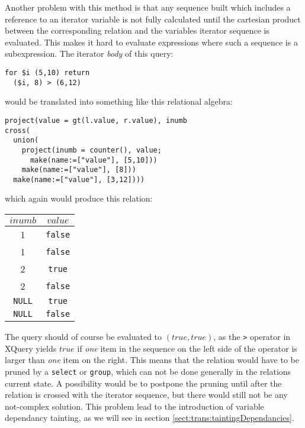 Another problem with this method is that any sequence built which includes a reference to an iterator variable is
not fully calculated until the cartesian product between the corresponding relation and the variables iterator
sequence is evaluated. This makes it hard to evaluate expressions where such a sequence is a subexpression. The
iterator \textit{body} of this query:

\begin{Verbatim}
for $i (5,10) return
  ($i, 8) > (6,12)
\end{Verbatim}
would be translated into something like this relational algebra:
\begin{Verbatim}
project(value = gt(l.value, r.value), inumb
cross(
  union(
    project(inumb = counter(), value;
      make(name:=["value"], [5,10]))
    make(name:=["value"], [8]))
  make(name:=["value"], [3,12])))
\end{Verbatim}
which again would produce this relation:

\begin{figure*}[!h]
\centering
\begin{tabular}{|c|c|} \hline
$inumb$ & $value$ \\\hline
1 & \texttt{false} \\\hline
1 & \texttt{false} \\\hline
2 & \texttt{true} \\\hline
2 & \texttt{false} \\\hline
\texttt{NULL} & \texttt{true} \\\hline
\texttt{NULL} & \texttt{false} \\\hline
\end{tabular}
\end{figure*}

The query should of course be evaluated to $(true, true)$, as the \texttt{>} operator in XQuery yields $true$ if
\textit{one} item in the sequence on the left side of the operator is larger than \textit{one} item on the right.
This means that the relation would have to be pruned by a \texttt{select} or \texttt{group}, which can not be done
generally in the relations current state. A possibility would be to postpone the pruning until after the relation
is crossed with the iterator sequence, but there would still not be any not-complex solution. This problem lead to
the introduction of variable dependancy tainting, as we will see in section
\ref{sect:trans:taintingDependancies}.

